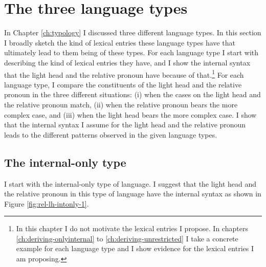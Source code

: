 \section{The three language types}\label{sec:three-types}

In Chapter \ref{ch:typology} I discussed three different language types. In this section I broadly sketch the kind of lexical entries these language types have that ultimately lead to them being of these types.
For each language type I start with describing the kind of lexical entries they have, and I show the internal syntax that the light head and the relative pronoun have because of that.\footnote{
In this chapter I do not motivate the lexical entries I propose. In chapters \ref{ch:deriving-onlyinternal} to \ref{ch:deriving-unrestricted} I take a concrete example for each language type and I show evidence for the lexical entries I am proposing.}
For each language type, I compare the constituents of the light head and the relative pronoun in the three different situations: (i) when the cases on the light head and the relative pronoun match, (ii) when the relative pronoun bears the more complex case, and (iii) when the light head bears the more complex case.
I show that the internal syntax I assume for the light head and the relative pronoun leads to the different patterns observed in the given language types.


\subsection{The internal-only type}\label{sec:basic-internal}

I start with the internal-only type of language. I suggest that the light head and the relative pronoun in this type of language have the internal syntax as shown in Figure \ref{fig:rel-lh-intonly-1}.

